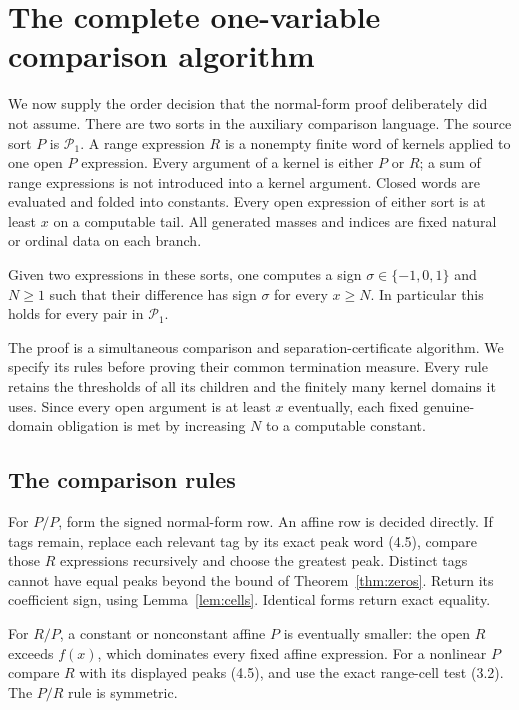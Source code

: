 \documentclass[11pt,a4paper]{article}
\begin{document}
\section{The complete one-variable comparison algorithm}
We now supply the order decision that the normal-form proof deliberately
did not assume. There are two sorts in the auxiliary comparison language.
The source sort $P$ is $\mathcal P_1$. A range expression $R$ is a
nonempty finite word of kernels applied to one open $P$ expression.
Every argument of a kernel is either $P$ or $R$; a sum of range expressions
is not introduced into a kernel argument. Closed words are evaluated and
folded into constants. Every open expression of either sort is at least
$x$ on a computable tail. All generated masses and indices are fixed
natural or ordinal data on each branch.

\begin{theorem}\label{thm:sign}
Given two expressions in these sorts, one computes a sign
$\sigma\in\{-1,0,1\}$ and $N\ge1$ such that their difference has sign
$\sigma$ for every $x\ge N$. In particular this holds for every pair in
$\mathcal P_1$.
\end{theorem}
The proof is a simultaneous comparison and separation-certificate algorithm.
We specify its rules before proving their common termination measure.
Every rule retains the thresholds of all its children and the finitely
many kernel domains it uses. Since every open argument is at least $x$
eventually, each fixed genuine-domain obligation is met by increasing
$N$ to a computable constant.

\subsection{The comparison rules}
For $P/P$, form the signed normal-form row. An affine row is decided
directly. If tags remain, replace each relevant tag by its exact peak
word (4.5), compare those $R$ expressions recursively and choose the
greatest peak. Distinct tags cannot have equal peaks beyond the bound of
Theorem~\ref{thm:zeros}. Return its coefficient sign, using
Lemma~\ref{lem:cells}. Identical forms return exact equality.

For $R/P$, a constant or nonconstant affine $P$ is eventually smaller:
the open $R$ exceeds $f(x)$, which dominates every fixed affine expression.
For a nonlinear $P$ compare $R$ with its displayed peaks (4.5), and use
the exact range-cell test (3.2). The $P/R$ rule is symmetric.
\end{document}

